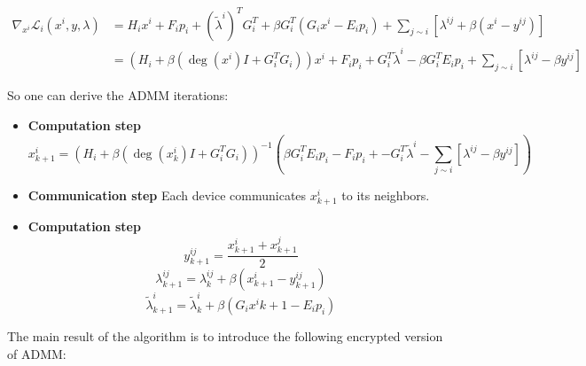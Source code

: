 \documentclass[10pt,english]{article}
\begin{document}
\begin{align}
    \nabla_{x^i} \mathcal{L}_i(x^i, y, \lambda) & = H_ix^i+F_ip_i+(\tilde\lambda^i)^T G_i^T+\beta G_i^T(G_ix^i-E_ip_i)+\sum_{j\sim i}[\lambda^{ij}+\beta(x^i-y^{ij})]\\
    & = (H_i+\beta(\deg(x^i)I+G_i^TG_i))x^i+F_ip_i+G_i^T\tilde\lambda^i -\beta G_i^T E_ip_i +\sum_{j\sim i}[\lambda^{ij}-\beta y^{ij}]
\end{align}

So one can derive the ADMM iterations:

\begin{itemize}
    \item \textbf{Computation step}
    \begin{equation}
        x^i_{k+1}=(H_i+\beta(\deg(x^i_k)I+G_i^TG_i))^{-1}\left(\beta G_i^T E_ip_i -F_ip_i+ - G_i^T\tilde\lambda^i -\sum_{j\sim i}[\lambda^{ij}-\beta y^{ij}]\right)
    \end{equation}
    \item \textbf{Communication step} Each device communicates $x^i_{k+1}$ to its neighbors.
    \item \textbf{Computation step}
    \begin{equation}
        y^{ij}_{k+1}=\dfrac{x^i_{k+1}+x^j_{k+1}}{2}
    \end{equation}
    \begin{equation}
        \lambda^{ij}_{k+1}=\lambda^{ij}_{k}+\beta(x^i_{k+1}-y^{ij}_{k+1})
    \end{equation}
    \begin{equation}
        \tilde\lambda_{k+1}^i=\tilde\lambda_{k}^i+\beta(G_ix^i{k+1}-E_ip_i)
    \end{equation}
\end{itemize}

The main result of the algorithm is to introduce the following encrypted version of ADMM:
\end{document}
